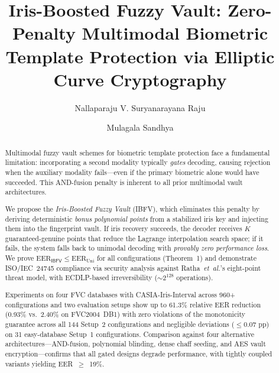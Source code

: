 \documentclass[3p,twocolumn]{elsarticle}
\newcommand{\IBFV}{\textsf{IBFV}}
\newcommand{\EER}{\mathrm{EER}}
\begin{document}
\begin{frontmatter}

\title{Iris-Boosted Fuzzy Vault: Zero-Penalty Multimodal Biometric Template Protection via Elliptic Curve Cryptography}

\author[nitw]{Nallaparaju V. Suryanarayana Raju}

\author[nitw]{Mulagala Sandhya}



\begin{abstract}
Multimodal fuzzy vault schemes for biometric template protection face a fundamental limitation: incorporating a second modality typically \emph{gates} decoding, causing rejection when the auxiliary modality fails---even if the primary biometric alone would have succeeded. This AND-fusion penalty is inherent to all prior multimodal vault architectures.

We propose the \emph{Iris-Boosted Fuzzy Vault} (\IBFV{}), which eliminates this penalty by deriving deterministic \emph{bonus polynomial points} from a stabilized iris key and injecting them into the fingerprint vault. If iris recovery succeeds, the decoder receives $K$ guaranteed-genuine points that reduce the Lagrange interpolation search space; if it fails, the system falls back to unimodal decoding with \emph{provably zero performance loss}. We prove $\EER_{\IBFV} \leq \EER_{\text{Uni}}$ for all configurations (Theorem~1) and demonstrate ISO/IEC~24745 compliance via security analysis against Ratha~\textit{et~al.}'s eight-point threat model, with ECDLP-based irreversibility ($\sim\!2^{128}$ operations).

Experiments on four FVC databases with CASIA-Iris-Interval across 960+ configurations and two evaluation setups show up to 61.3\% relative EER reduction (0.93\% vs.\ 2.40\% on FVC2004~DB1) with zero violations of the monotonicity guarantee across all 144 Setup~2 configurations and negligible deviations ($\leq 0.07$ pp) on 31 easy-database Setup~1 configurations. Comparison against four alternative architectures---AND-fusion, polynomial blinding, dense chaff seeding, and AES vault encryption---confirms that all gated designs degrade performance, with tightly coupled variants yielding EER~$\geq$~19\%.
\end{abstract}


\end{frontmatter}
\end{document}
